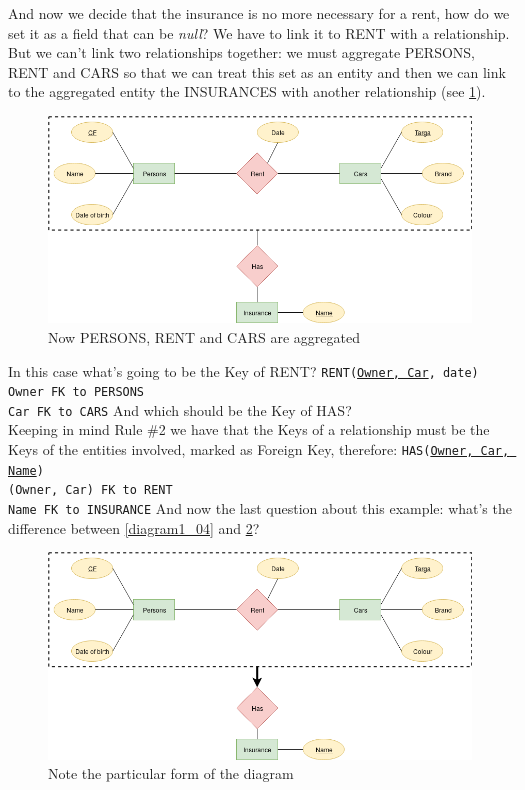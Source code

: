 \documentclass[12pt, oneside]{report}
\newcommand\tab[1][1cm]{\hspace*{#1}}
\begin{document}
And now we decide that the insurance is no more necessary for a rent, how do we set it as a field that can be \emph{null}?
We have to link it to RENT with a relationship.
But we can't link two relationships together: we must aggregate PERSONS, RENT and CARS so that we can treat this set as an entity and then we can link to the aggregated entity the INSURANCES with another relationship (see \ref{diagram1_05}).
\begin{figure}[H]
	\centering
	\includegraphics[width=\textwidth,keepaspectratio]{diagram1_05.png}
	\caption{Now PERSONS, RENT and CARS are aggregated}
	\label{diagram1_05}
\end{figure}
In this case what's going to be the Key of RENT?
\vskip 10pt
\texttt{RENT(\underline{Owner, Car}, date)}\\
	\tab[.8cm] \texttt{Owner FK to PERSONS}\\
	\tab[.8cm] \texttt{Car FK to CARS}
\vskip 10pt
\noindent And which should be the Key of HAS?\\
Keeping in mind Rule \#2 we have that the Keys of a relationship must be the Keys of the entities involved, marked as Foreign Key, therefore:
\vskip 10pt
\texttt{HAS(\underline{Owner, Car, Name})}\\
	\tab[.8cm] \texttt{(Owner, Car) FK to RENT}\\
	\tab[.8cm] \texttt{Name FK to INSURANCE}
\vskip 10pt
And now the last question about this example: what's the difference between \ref{diagram1_04} and \ref{diagram1_06}?
\begin{figure}[H]
	\centering
	\includegraphics[width=\textwidth,keepaspectratio]{diagram1_06.png}
	\caption{Note the particular form of the diagram}
	\label{diagram1_06}
\end{figure}
\end{document}

